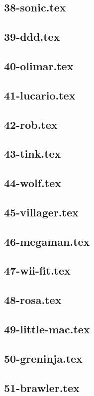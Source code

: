 \subsection{38-sonic.tex}
\subsection{39-ddd.tex}
\subsection{40-olimar.tex}
\subsection{41-lucario.tex}
\subsection{42-rob.tex}
\subsection{43-tink.tex}
\subsection{44-wolf.tex}
\subsection{45-villager.tex}
\subsection{46-megaman.tex}
\subsection{47-wii-fit.tex}
\subsection{48-rosa.tex}
\subsection{49-little-mac.tex}
\subsection{50-greninja.tex}
\subsection{51-brawler.tex}
